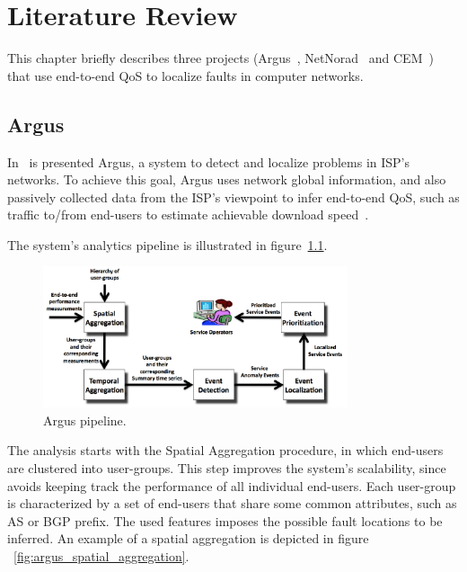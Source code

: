 \chapter{Literature Review}

This chapter briefly describes three projects
(Argus~\cite{argus_end_to_end_service_anomaly_detection_and_localization_from_an_isps_point_of_view},
NetNorad~\cite{netnorad}
and CEM~\cite{crowdsourcing_service_level_network_event_monitoring})
that use end-to-end QoS to localize faults in computer networks.

\section{Argus}

In~\cite{argus_end_to_end_service_anomaly_detection_and_localization_from_an_isps_point_of_view}
is presented Argus, a system to
detect and localize problems in ISP's networks. To achieve this goal, Argus uses
network global information, and also passively collected data from the ISP's
viewpoint to infer
end-to-end QoS, such as traffic to/from end-users to estimate achievable
download
speed~\cite{speed_testing_without_speed_tests_estimating_achievable_download_speed_from_passive_measurements}.

The system's analytics pipeline is illustrated in
figure~\ref{fig:argus_pipeline}.

\begin{figure}[H]
    \centering
    \includegraphics[width=0.8\textwidth]{./figures/literature_review/argus_pipeline.png}
    \caption{Argus pipeline.~\cite{argus_end_to_end_service_anomaly_detection_and_localization_from_an_isps_point_of_view}}
\label{fig:argus_pipeline}
\end{figure}%

The analysis starts with the Spatial Aggregation procedure, in which
end-users are clustered into user-groups. This step improves the system's
scalability, since avoids keeping track the performance of all
individual end-users.
Each user-group is characterized by a set of end-users that share some common
attributes, such as AS or BGP prefix. The used features imposes the possible
fault locations to be inferred.
An example of a spatial aggregation is depicted in figure
~\ref{fig:argus_spatial_aggregation}.

